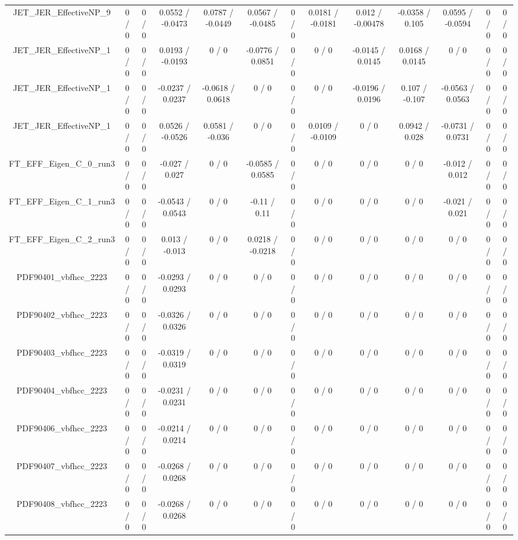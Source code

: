 \documentclass[10pt]{article}
\begin{document}
\begin{table}[htbp]
\begin{center}
\begin{tabular}{|c|c|c|c|c|c|c|c|c|c|c|c|c|}
  JET_JER_EffectiveNP_9 & 0 / 0 & 0 / 0 & 0.0552 / -0.0473 & 0.0787 / -0.0449 & 0.0567 / -0.0485 & 0 / 0 & 0.0181 / -0.0181 & 0.012 / -0.00478 & -0.0358 / 0.105 & 0.0595 / -0.0594 & 0 / 0 & 0 / 0 \\ 
  JET_JER_EffectiveNP_1 & 0 / 0 & 0 / 0 & 0.0193 / -0.0193 & 0 / 0 & -0.0776 / 0.0851 & 0 / 0 & 0 / 0 & -0.0145 / 0.0145 & 0.0168 / 0.0145 & 0 / 0 & 0 / 0 & 0 / 0 \\ 
  JET_JER_EffectiveNP_1 & 0 / 0 & 0 / 0 & -0.0237 / 0.0237 & -0.0618 / 0.0618 & 0 / 0 & 0 / 0 & 0 / 0 & -0.0196 / 0.0196 & 0.107 / -0.107 & -0.0563 / 0.0563 & 0 / 0 & 0 / 0 \\ 
  JET_JER_EffectiveNP_1 & 0 / 0 & 0 / 0 & 0.0526 / -0.0526 & 0.0581 / -0.036 & 0 / 0 & 0 / 0 & 0.0109 / -0.0109 & 0 / 0 & 0.0942 / 0.028 & -0.0731 / 0.0731 & 0 / 0 & 0 / 0 \\ 
  FT_EFF_Eigen_C_0_run3 & 0 / 0 & 0 / 0 & -0.027 / 0.027 & 0 / 0 & -0.0585 / 0.0585 & 0 / 0 & 0 / 0 & 0 / 0 & 0 / 0 & -0.012 / 0.012 & 0 / 0 & 0 / 0 \\ 
  FT_EFF_Eigen_C_1_run3 & 0 / 0 & 0 / 0 & -0.0543 / 0.0543 & 0 / 0 & -0.11 / 0.11 & 0 / 0 & 0 / 0 & 0 / 0 & 0 / 0 & -0.021 / 0.021 & 0 / 0 & 0 / 0 \\ 
  FT_EFF_Eigen_C_2_run3 & 0 / 0 & 0 / 0 & 0.013 / -0.013 & 0 / 0 & 0.0218 / -0.0218 & 0 / 0 & 0 / 0 & 0 / 0 & 0 / 0 & 0 / 0 & 0 / 0 & 0 / 0 \\ 
  PDF90401_vbfhcc_2223 & 0 / 0 & 0 / 0 & -0.0293 / 0.0293 & 0 / 0 & 0 / 0 & 0 / 0 & 0 / 0 & 0 / 0 & 0 / 0 & 0 / 0 & 0 / 0 & 0 / 0 \\ 
  PDF90402_vbfhcc_2223 & 0 / 0 & 0 / 0 & -0.0326 / 0.0326 & 0 / 0 & 0 / 0 & 0 / 0 & 0 / 0 & 0 / 0 & 0 / 0 & 0 / 0 & 0 / 0 & 0 / 0 \\ 
  PDF90403_vbfhcc_2223 & 0 / 0 & 0 / 0 & -0.0319 / 0.0319 & 0 / 0 & 0 / 0 & 0 / 0 & 0 / 0 & 0 / 0 & 0 / 0 & 0 / 0 & 0 / 0 & 0 / 0 \\ 
  PDF90404_vbfhcc_2223 & 0 / 0 & 0 / 0 & -0.0231 / 0.0231 & 0 / 0 & 0 / 0 & 0 / 0 & 0 / 0 & 0 / 0 & 0 / 0 & 0 / 0 & 0 / 0 & 0 / 0 \\ 
  PDF90406_vbfhcc_2223 & 0 / 0 & 0 / 0 & -0.0214 / 0.0214 & 0 / 0 & 0 / 0 & 0 / 0 & 0 / 0 & 0 / 0 & 0 / 0 & 0 / 0 & 0 / 0 & 0 / 0 \\ 
  PDF90407_vbfhcc_2223 & 0 / 0 & 0 / 0 & -0.0268 / 0.0268 & 0 / 0 & 0 / 0 & 0 / 0 & 0 / 0 & 0 / 0 & 0 / 0 & 0 / 0 & 0 / 0 & 0 / 0 \\ 
  PDF90408_vbfhcc_2223 & 0 / 0 & 0 / 0 & -0.0268 / 0.0268 & 0 / 0 & 0 / 0 & 0 / 0 & 0 / 0 & 0 / 0 & 0 / 0 & 0 / 0 & 0 / 0 & 0 / 0 \\ 

\end{tabular}
\end{center}
\end{table}
\end{document}
